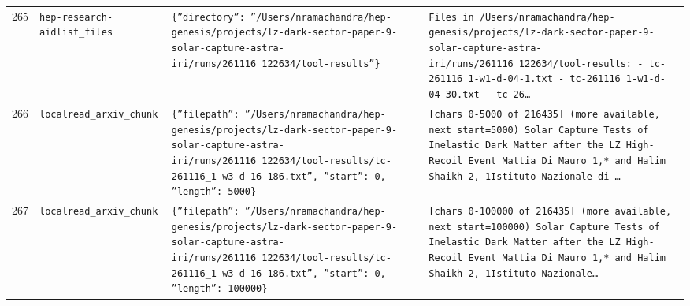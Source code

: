 \documentclass[11pt,a4paper]{article}
\begin{document}
\begin{longtable}{@{}p{}p{}p{}p{}@{}}
265 & \texttt{hep-research-aid}\newline\texttt{list\_\allowbreak{}files} & \texttt{\{''directory'':\allowbreak{} ''/\allowbreak{}Users/\allowbreak{}nramachandra/\allowbreak{}hep-genesis/\allowbreak{}projects/\allowbreak{}lz-dark-sector-paper-9-solar-capture-astra-iri/\allowbreak{}runs/\allowbreak{}261116\_\allowbreak{}122634/\allowbreak{}tool-results''\}\allowbreak{}} & \texttt{Files in /\allowbreak{}Users/\allowbreak{}nramachandra/\allowbreak{}hep-genesis/\allowbreak{}projects/\allowbreak{}lz-dark-sector-paper-9-solar-capture-astra-iri/\allowbreak{}runs/\allowbreak{}261116\_\allowbreak{}122634/\allowbreak{}tool-results:\allowbreak{}   - tc-261116\_\allowbreak{}1-w1-d-04-1.txt   - tc-261116\_\allowbreak{}1-w1-d-04-30.txt   - tc-26\ldots{}\allowbreak{}} \\
266 & \texttt{local}\newline\texttt{read\_\allowbreak{}arxiv\_\allowbreak{}chunk} & \texttt{\{''filepath'':\allowbreak{} ''/\allowbreak{}Users/\allowbreak{}nramachandra/\allowbreak{}hep-genesis/\allowbreak{}projects/\allowbreak{}lz-dark-sector-paper-9-solar-capture-astra-iri/\allowbreak{}runs/\allowbreak{}261116\_\allowbreak{}122634/\allowbreak{}tool-results/\allowbreak{}tc-261116\_\allowbreak{}1-w3-d-16-186.txt'',\allowbreak{} ''start'':\allowbreak{} 0,\allowbreak{} ''length'':\allowbreak{} 5000\}\allowbreak{}} & \texttt{[chars 0-5000 of 216435]\allowbreak{} (more available,\allowbreak{} next start=\allowbreak{}5000)\allowbreak{}  Solar Capture Tests of Inelastic Dark Matter after the LZ High-Recoil Event Mattia Di Mauro 1,\allowbreak{}* and Halim Shaikh 2,\allowbreak{}\dag{}\allowbreak{} 1Istituto Nazionale di \ldots{}\allowbreak{}} \\
267 & \texttt{local}\newline\texttt{read\_\allowbreak{}arxiv\_\allowbreak{}chunk} & \texttt{\{''filepath'':\allowbreak{} ''/\allowbreak{}Users/\allowbreak{}nramachandra/\allowbreak{}hep-genesis/\allowbreak{}projects/\allowbreak{}lz-dark-sector-paper-9-solar-capture-astra-iri/\allowbreak{}runs/\allowbreak{}261116\_\allowbreak{}122634/\allowbreak{}tool-results/\allowbreak{}tc-261116\_\allowbreak{}1-w3-d-16-186.txt'',\allowbreak{} ''start'':\allowbreak{} 0,\allowbreak{} ''length'':\allowbreak{} 100000\}\allowbreak{}} & \texttt{[chars 0-100000 of 216435]\allowbreak{} (more available,\allowbreak{} next start=\allowbreak{}100000)\allowbreak{}  Solar Capture Tests of Inelastic Dark Matter after the LZ High-Recoil Event Mattia Di Mauro 1,\allowbreak{}* and Halim Shaikh 2,\allowbreak{}\dag{}\allowbreak{} 1Istituto Nazionale\ldots{}\allowbreak{}} \\

\end{longtable}
\end{document}
